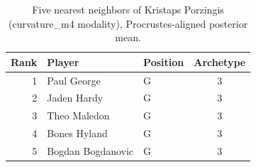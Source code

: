 \begin{table}[htbp]
  \centering\small
  \begin{tabular}{rllc}
    \toprule
    Rank & Player & Position & Archetype \\
    \midrule
    1 & Paul George & G & 3 \\
    2 & Jaden Hardy & G & 3 \\
    3 & Theo Maledon & G & 3 \\
    4 & Bones Hyland & G & 3 \\
    5 & Bogdan Bogdanovic & G & 3 \\
    \bottomrule
  \end{tabular}
  \caption{Five nearest neighbors of Kristaps Porzingis (curvature_m4 modality), Procrustes-aligned posterior mean.}
  \label{tab:Kristaps_Porzingis_neighbors_curvature_m4}
\end{table}

